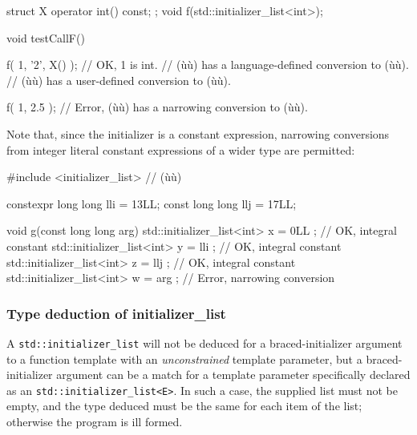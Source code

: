 \begin{emcppslisting}[emcppsbatch=e4]
struct X { operator int() const; };
void f(std::initializer_list<int>);

void testCallF()
{
    f({ 1, '2', X() });  // OK, 1 is int.
                         //     (ù{}ù) has a language-defined conversion to (ù{}ù).
                         //     (ù{}ù) has a user-defined conversion to (ù{}ù).

    f({ 1, 2.5 });       // Error, (ù{}ù) has a narrowing conversion to (ù{}ù).
}
\end{emcppslisting}
    

\noindent Note that, since the initializer is a constant expression, narrowing
conversions from integer literal constant expressions of a wider type
are permitted:

\begin{emcppslisting}
#include <initializer_list>  // (ù{}ù)

constexpr long long lli = 13LL;
const     long long llj = 17LL;

void g(const long long arg)
{
    std::initializer_list<int> x = { 0LL };  // OK, integral constant
    std::initializer_list<int> y = { lli };  // OK, integral constant
    std::initializer_list<int> z = { llj };  // OK, integral constant
    std::initializer_list<int> w = { arg };  // Error, narrowing conversion
}
\end{emcppslisting}
    

\subsubsection[Type deduction of \lstinline!initializer_list!]{Type deduction of {\SubsubsecCode initializer\_list}}\label{type-deduction-of-initializer_list}

A \lstinline!std::initializer_list! will not be deduced for a
braced-initializer argument to a function template with an
\emph{unconstrained} template parameter, but a braced-initializer
argument can be a match for a template parameter specifically declared
as an \lstinline!std::initializer_list<E>!. In such a case, the supplied
list must not be empty, and the type deduced must be the same for each
item of the list; otherwise the program is ill formed.

